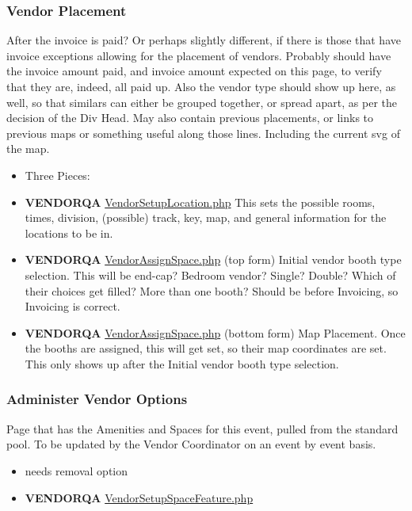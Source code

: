 \documentclass[captions=tablesignature]{scrartcl}
\begin{document}
\subsubsection{Vendor Placement}
\label{sec-3-1-12}
After the invoice is paid? Or perhaps slightly different, if there
is those that have invoice exceptions allowing for the placement
of vendors.  Probably should have the invoice amount paid, and
invoice amount expected on this page, to verify that they are,
indeed, all paid up.  Also the vendor type should show up here, as
well, so that similars can either be grouped together, or spread
apart, as per the decision of the Div Head. May also contain
previous placements, or links to previous maps or something useful
along those lines.  Including the current svg of the map.
\begin{itemize}
\item Three Pieces:
\end{itemize}
\begin{itemize}
\item {\bfseries\sffamily VENDORQA} \href{../webpages/VendorSetupLocation.php}{VendorSetupLocation.php}
\label{sec-3-1-12-1}
This sets the possible rooms, times, division, (possible) track,
key, map, and general information for the locations to be in.

\item {\bfseries\sffamily VENDORQA} \href{../webpages/VendorAssignSpace.php}{VendorAssignSpace.php} (top form)
\label{sec-3-1-12-2}
Initial vendor booth type selection.
This will be end-cap?  Bedroom vendor?  Single?  Double? Which of
their choices get filled? More than one booth? Should be before
Invoicing, so Invoicing is correct.

\item {\bfseries\sffamily VENDORQA} \href{../webpages/VendorAssignSpace.php}{VendorAssignSpace.php} (bottom form)
\label{sec-3-1-12-3}
Map Placement.
Once the booths are assigned, this will get set, so their map
coordinates are set.  This only shows up after the Initial vendor
booth type selection.
\end{itemize}

\subsubsection{Administer Vendor Options}
\label{sec-3-1-13}
Page that has the Amenities and Spaces for this event, pulled from
the standard pool.  To be updated by the Vendor Coordinator on an
event by event basis.
\begin{itemize}
\item needs removal option
\end{itemize}
\begin{itemize}
\item {\bfseries\sffamily VENDORQA} \href{../webpages/VendorSetupSpaceFeature.php}{VendorSetupSpaceFeature.php}
\label{sec-3-1-13-1}
\end{itemize}
\end{document}
